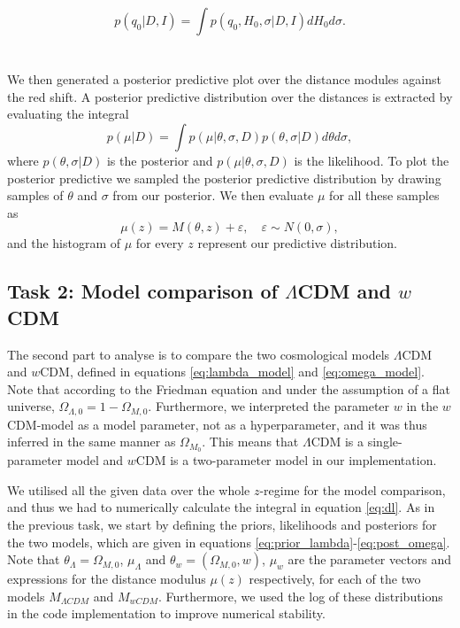 \documentclass[11pt,a4paper]{article}
\begin{document}
\begin{equation*}
    p(q_0|D,I) = \int p(q_0,H_0, \sigma|D,I) d H_0 d\sigma.
\end{equation*}
\newline
\\\\
We then generated a posterior predictive plot over the distance modules against the red shift. A posterior predictive distribution over the distances is extracted by evaluating the integral 
\begin{equation*}
    p(\mu| D) = \int p(\mu|\theta, \sigma, D) p(\theta, \sigma| D) d\theta d\sigma,
\end{equation*}
where $ p(\theta, \sigma| D)$ is the posterior and $p(\mu|\theta, \sigma, D)$ is the likelihood. To plot the posterior predictive we sampled the posterior predictive distribution by drawing samples of $\theta$ and $\sigma$ from our posterior. We then evaluate $\mu$ for all these samples as 
\begin{equation*}
    \mu(z) = M(\theta, z) + \varepsilon, \quad \varepsilon \sim N(0, \sigma),
\end{equation*}
and the histogram of $\mu$ for every $z$ represent our predictive distribution. 



\subsection[Task 2]{Task 2: Model comparison of $\Lambda$CDM and $w$CDM}

The second part to analyse is to compare the two cosmological models $\Lambda$CDM and $w$CDM, defined in equations \eqref{eq:lambda_model} and \eqref{eq:omega_model}. Note that according to the Friedman equation and under the assumption of a flat universe, $\Omega_{\Lambda,0}=1-\Omega_{M,0}$. Furthermore, we interpreted the parameter $w$ in the $w$CDM-model as a model parameter, not as a hyperparameter, and it was thus inferred in the same manner as $\Omega_{M_0}$. This means that $\Lambda$CDM is a single-parameter model and $w$CDM is a two-parameter model in our implementation.

We utilised all the given data over the whole $z$-regime for the model comparison, and thus we had to numerically calculate the integral in equation \eqref{eq:dl}. As in the previous task, we start by defining the priors, likelihoods and posteriors for the two models, which are given in equations \eqref{eq:prior_lambda}-\eqref{eq:post_omega}. Note that $\theta_\Lambda=\Omega_{M,0}$, $\mu_{\Lambda}$ and $\theta_w=(\Omega_{M,0}, w)$, $\mu_{w}$ are the parameter vectors and expressions for the distance modulus $\mu(z)$ respectively, for each of the two models $M_{\Lambda CDM}$ and $M_{wCDM}$. Furthermore, we used the log of these distributions in the code implementation to improve numerical stability. 
\end{document}
